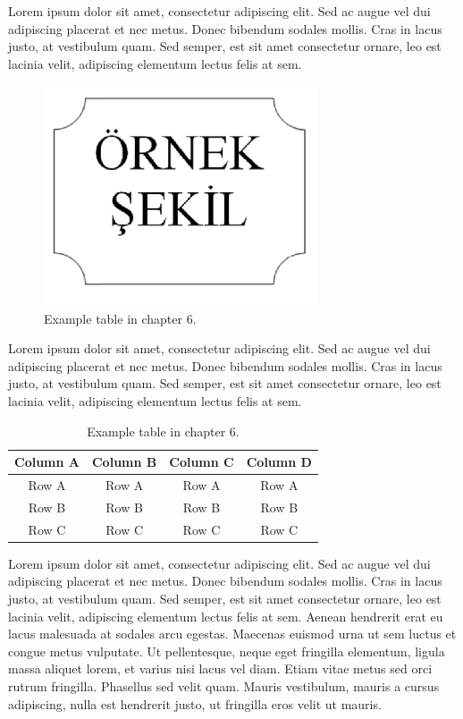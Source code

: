 Lorem ipsum dolor sit amet, consectetur adipiscing elit. Sed ac augue vel dui 
adipiscing placerat et nec metus. Donec bibendum sodales mollis. Cras in lacus 
justo, at vestibulum quam. Sed semper, est sit amet consectetur ornare, leo est 
lacinia velit, adipiscing elementum lectus felis at sem.

\begin{figure}
 \centering
 \includegraphics[width=230pt,keepaspectratio=true]{./fig/sekil7}
 \caption{Example table in chapter 6.}
 \label{fig:6-1}
\end{figure}

Lorem ipsum dolor sit amet, consectetur adipiscing elit. Sed ac augue vel dui 
adipiscing placerat et nec metus. Donec bibendum sodales mollis. Cras in lacus 
justo, at vestibulum quam. Sed semper, est sit amet consectetur ornare, leo est 
lacinia velit, adipiscing elementum lectus felis at sem.

\begin{table}
{\setlength{\tabcolsep}{14pt}
\caption{Example table in chapter 6.}
\begin{center}
\vspace{-6mm}
\begin{tabular}{cccc}
\hline\hline
Column A & Column B & Column C & Column D \\
\hline
Row A & Row A & Row A & Row A \\
Row B & Row B & Row B & Row B \\
Row C & Row C & Row C & Row C \\
\hline
\end{tabular}
\vspace{-6mm}
\end{center}
\label{tableforCh6-1}}
\end{table}

Lorem ipsum dolor sit amet, consectetur adipiscing elit. Sed ac augue vel dui 
adipiscing placerat et nec metus. Donec bibendum sodales mollis. Cras in lacus 
justo, at vestibulum quam. Sed semper, est sit amet consectetur ornare, leo est 
lacinia velit, adipiscing elementum lectus felis at sem. Aenean hendrerit erat eu 
lacus malesuada at sodales arcu egestas. Maecenas euismod urna ut sem luctus et 
congue metus vulputate. Ut pellentesque, neque eget fringilla elementum, ligula 
massa aliquet lorem, et varius nisi lacus vel diam. Etiam vitae metus sed orci 
rutrum fringilla. Phasellus sed velit quam. Mauris vestibulum, mauris a cursus 
adipiscing, nulla est hendrerit justo, ut fringilla eros velit ut mauris.